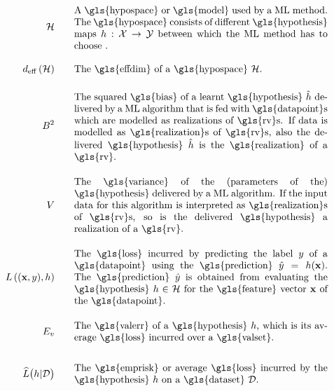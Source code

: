 \begin{align}
	\hypospace  \quad\quad & \parbox{.75\textwidth}{A \gls{hypospace} or \gls{model} used by a ML method. 
		The \gls{hypospace} consists of different \gls{hypothesis} maps $\hypothesis: \featurespace \rightarrow \labelspace$ between which 
		the ML method has to choose .}    \nonumber \\[4mm]
	\effdim{\hypospace}  \quad\quad & \parbox{.75\textwidth}{The \gls{effdim} of a \gls{hypospace} $\hypospace$.}   \nonumber \\[4mm]
	\biasterm^2 \quad\quad &\parbox{.75\textwidth}{The squared \gls{bias} of a learnt \gls{hypothesis} $\learnthypothesis$ 
		delivered by a ML algorithm that is fed with \gls{datapoint}s which are modelled as 
		realizations of \gls{rv}s. If data is modelled as \gls{realization}s of \gls{rv}s, also the 
		delivered \gls{hypothesis} $\learnthypothesis$ is the \gls{realization} of a \gls{rv}.} \nonumber  \\[4mm] 
	\varianceterm \quad\quad &\parbox{.75\textwidth}{The \gls{variance} of the (parameters of the) \gls{hypothesis} 
		delivered by a ML algorithm. If the input data for this algorithm is interpreted as \gls{realization}s of \gls{rv}s, so 
		is the delivered \gls{hypothesis} a realization of a \gls{rv}.} \nonumber \\[4mm] 
	\lossfunc{(\featurevec,\truelabel)}{\hypothesis}  \quad\quad & \parbox{.75\textwidth}{The \gls{loss} incurred by predicting the 
		label $\truelabel$ of a \gls{datapoint} using the \gls{prediction} $\hat{\truelabel}=h(\featurevec)$. The 
		\gls{prediction} $\hat{\truelabel}$ is obtained from evaluating the \gls{hypothesis} $\hypothesis \in \hypospace$ for 
		the \gls{feature} vector $\featurevec$ of the \gls{datapoint}.}    \nonumber   \\[4mm] 
	\valerror \quad\quad &\parbox{.75\textwidth}{The \gls{valerr} of a \gls{hypothesis} $\hypothesis$, which is its 
		average \gls{loss} incurred over a \gls{valset}.} \nonumber \\[6mm] 
	\emperror\big(h| \dataset \big) \quad\quad &\parbox{.75\textwidth}{The \gls{emprisk} or average \gls{loss} 
		incurred by the \gls{hypothesis} $\hypothesis$ on a \gls{dataset} $\dataset$.} \nonumber                           
\end{align}     

